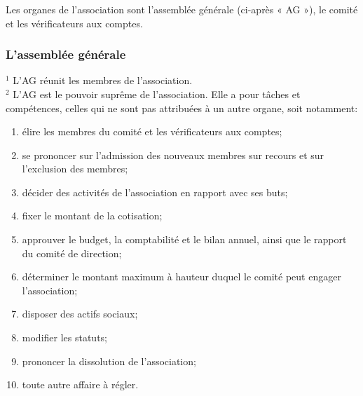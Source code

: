 \documentclass[12pt,a4paper,oneside]{article}
\newcounter{art}
\newcommand{\french}{    \switchcolumn[1]\noindent}
\newcounter{para}
\begin{document}
\begin{paracol}{2}
\french
	\subsubsection{}
	Les organes de l’association sont l’assemblée générale (ci-après « AG »), le comité et les vérificateurs aux comptes.

\french
	\subsubsection{L’assemblée générale}
	$^1$ L’AG réunit les membres de l’association. \\
	$^2$ L’AG est le pouvoir suprême de l’association. Elle a pour tâches et compétences, celles qui ne sont pas attribuées à un autre organe, soit notamment:
	
	\begin{enumerate}[-]
	\item élire les membres du comité et les vérificateurs aux comptes;
	\item se prononcer sur l’admission des nouveaux membres sur recours et sur l’exclusion des
	membres; 
	\item décider des activités de l’association en rapport avec ses buts;
	\item fixer le montant de la cotisation;
	\item approuver le budget, la comptabilité et le bilan annuel, ainsi que le rapport du comité
	de direction;
	\item déterminer le montant maximum à hauteur duquel le comité peut engager
	l’association;
	\item disposer des actifs sociaux;
 	\item modifier les statuts;
 	\item prononcer la dissolution de l’association;
 	\item toute autre affaire à régler.
	\end{enumerate}

\french
	\subsubsection{}


\end{paracol}
\end{document}
